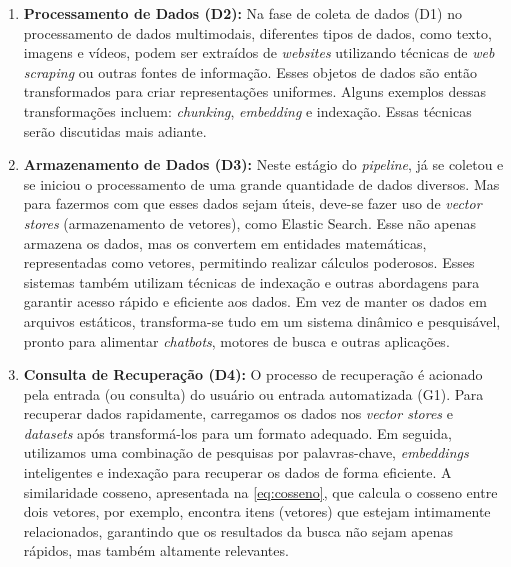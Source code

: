 \documentclass[a4paper, 12pt]{article}
\begin{document}
    \begin{enumerate}
        \item \textbf{Processamento de Dados (D2):} Na fase de coleta de dados (D1) no processamento de dados multimodais, diferentes tipos de dados, como texto, imagens e vídeos, podem ser extraídos de \textit{websites} utilizando técnicas de \textit{web scraping} ou outras fontes de informação. Esses objetos de dados são então transformados para criar representações uniformes. Alguns exemplos dessas transformações incluem: \textit{chunking}, \textit{embedding} e indexação. Essas técnicas serão discutidas mais adiante.
        \item \textbf{Armazenamento de Dados (D3):} Neste estágio do \textit{pipeline}, já se coletou e se iniciou o processamento de uma grande quantidade de dados diversos. Mas para fazermos com que esses dados sejam úteis, deve-se fazer uso de \textit{vector stores} (armazenamento de vetores), como Elastic Search. Esse não apenas armazena os dados, mas os convertem em entidades matemáticas, representadas como vetores, permitindo realizar cálculos poderosos. Esses sistemas também utilizam técnicas de indexação e outras abordagens para garantir acesso rápido e eficiente aos dados. Em vez de manter os dados em arquivos estáticos, transforma-se tudo em um sistema dinâmico e pesquisável, pronto para alimentar \textit{chatbots}, motores de busca e outras aplicações.
        \item \textbf{Consulta de Recuperação (D4):} O processo de recuperação é acionado pela entrada (ou consulta) do usuário ou entrada automatizada (G1). Para recuperar dados rapidamente, carregamos os dados nos \textit{vector stores} e \textit{datasets} após transformá-los para um formato adequado. Em seguida, utilizamos uma combinação de pesquisas por palavras-chave, \textit{embeddings} inteligentes e indexação para recuperar os dados de forma eficiente.
        A similaridade cosseno, apresentada na \autoref{eq:cosseno}, que calcula o cosseno entre dois vetores, por exemplo, encontra itens (vetores) que estejam intimamente relacionados, garantindo que os resultados da busca não sejam apenas rápidos, mas também altamente relevantes.
    \end{enumerate}
\end{document}

